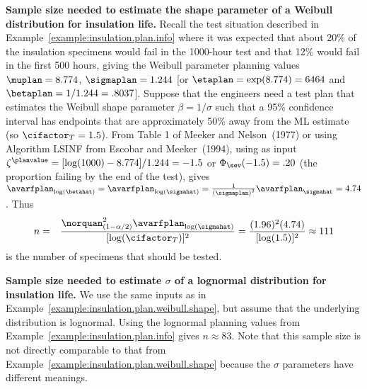 \begin{example}
\label{example:insulation.plan.weibull.shape}
{\bf Sample size needed to estimate the shape parameter of a Weibull
distribution for insulation life.}  Recall the test situation
described in Example~\ref{example:insulation.plan.info} where it was
expected that about 20\% of the insulation specimens would fail in
the 1000-hour test and that 12\% would fail in the first 500 hours,
giving the Weibull parameter planning values $\muplan=8.774$,
$\sigmaplan=1.244$ [or $\etaplan=\exp(8.774)= 6464$ and
$\betaplan=1/1.244=.8037$]. Suppose that the engineers need a test
plan that estimates the Weibull shape parameter $\beta=1/\sigma$
such that a 95\% confidence interval has endpoints that are
approximately 50\% away from the ML estimate (so
$\cifactor_{T}=1.5$).  From Table 1 of Meeker and Nelson~(1977) or
using Algorithm LSINF from Escobar and Meeker~(1994), using as input
$\zeta^{\planvalue}=[\log(1000)-8.774]/1.244 = -1.5$ or
$\Phi_{\sev}(-1.5)=.20$ (the proportion failing by the end of the
test), gives
$\avarfplan_{\log(\betahat)}=\avarfplan_{\log(\sigmahat)}=
\frac{1}{\left(\sigmaplan \right)^2}\avarfplan_{\sigmahat}=4.74$. Thus
\begin{eqnarray*}
	n&=&\frac{\norquan_{(1-\alpha/2)}^{2}
	\avarfplan_{\log(\sigmahat)}}{[\log(\cifactor_{T})]^2}=
	\frac{(1.96)^{2}(4.74)}{[\log(1.5)]^2} \approx 111
\end{eqnarray*}
is the number of specimens that should be tested.
\end{example}

\begin{example}
\label{example:insulation.plan.lognormal.shape}
{\bf Sample size needed to estimate $\sigma$
of a lognormal distribution for insulation life.}
We use the same inputs as in  
Example~\ref{example:insulation.plan.weibull.shape}, 
but assume that the underlying distribution is lognormal. 
Using the lognormal planning values from 
Example~\ref{example:insulation.plan.info} gives $n \approx 83$.
Note that this sample size is not directly comparable to that from
Example~\ref{example:insulation.plan.weibull.shape} because the 
$\sigma$ parameters have different meanings.
\end{example}
